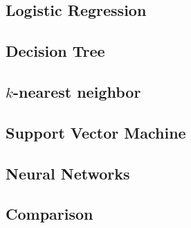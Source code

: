 \subsection{Logistic Regression}

\subsection{Decision Tree}

\subsection{$k$-nearest neighbor}

\subsection{Support Vector Machine}

\subsection{Neural Networks}

\subsection{Comparison}
